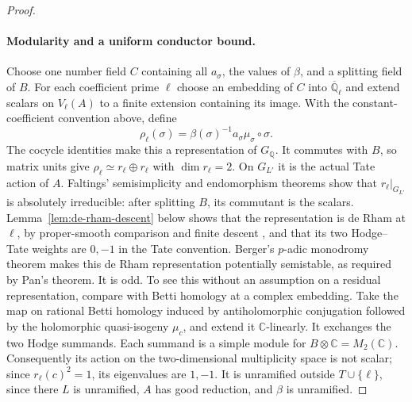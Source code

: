 \documentclass[11pt]{article}
\theoremstyle{definition}
\theoremstyle{remark}
\newcommand{\Q}{\mathbb Q}
\begin{document}
\begin{proof}
\paragraph{Modularity and a uniform conductor bound.}
Choose one number field $C$ containing all $a_\sigma$, the values of
$\beta$, and a splitting field of $B$. For each coefficient prime
$\ell$ choose an embedding of $C$ into $\overline{\mathbb Q}_\ell$
and extend scalars on $V_\ell(A)$ to a finite extension containing
its image. With the constant-coefficient convention above, define
\[
 \rho_\ell(\sigma)
   =\beta(\sigma)^{-1}a_\sigma\mu_\sigma\circ\sigma.
\]
The cocycle identities make this a representation of $G_\Q$.
It commutes with $B$, so matrix units give
$\rho_\ell\simeq r_\ell\oplus r_\ell$ with $\dim r_\ell=2$.
On $G_{L'}$ it is the actual Tate action of $A$.
Faltings' semisimplicity and endomorphism theorems
\cite{faltings1983} show that $r_\ell|_{G_{L'}}$ is absolutely
irreducible: after splitting $B$, its commutant is the scalars.
Lemma~\ref{lem:de-rham-descent} below shows that the representation
is de Rham at $\ell$, by proper-smooth comparison and finite descent
\cite{scholze2013,scholze-erratum}, and that its
two Hodge--Tate weights are $0,-1$ in the Tate convention.
Berger's $p$-adic monodromy theorem \cite{berger2002} makes this
de Rham representation potentially semistable, as required by
Pan's theorem.
It is odd. To see this without an assumption on a residual
representation, compare with Betti homology at a complex
embedding. Take the map on rational Betti homology induced by
antiholomorphic conjugation followed by the holomorphic
quasi-isogeny $\mu_c$, and extend it $\mathbb C$-linearly.
It exchanges the two Hodge summands. Each
summand is a simple module for $B\otimes\mathbb C=M_2(\mathbb C)$.
Consequently its action on the two-dimensional multiplicity
space is not scalar; since $r_\ell(c)^2=1$, its eigenvalues
are $1,-1$.
It is unramified outside $T\cup\{\ell\}$, since there $L$ is
unramified, $A$ has good reduction, and $\beta$ is unramified.


\end{proof}
\end{document}

